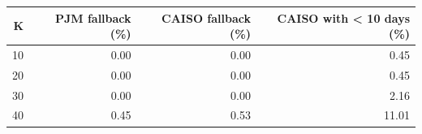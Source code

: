 \begin{tabular}{rrrr}
\toprule
K & PJM fallback (\%) & CAISO fallback (\%) & CAISO with < 10 days (\%) \\
\midrule
10 & 0.00 & 0.00 & 0.45 \\ %
20 & 0.00 & 0.00 & 0.45 \\ %
30 & 0.00 & 0.00 & 2.16 \\ %
40 & 0.45 & 0.53 & 11.01 \\ %
\bottomrule
\end{tabular}
